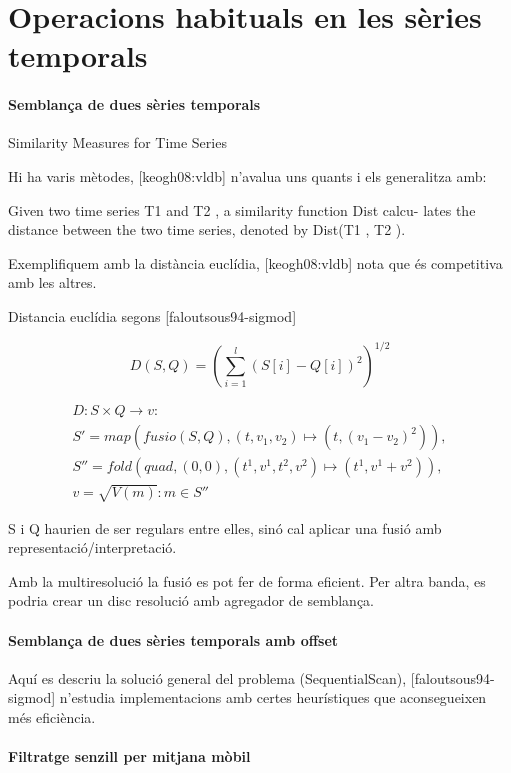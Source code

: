 \section{Operacions habituals en les sèries temporals}


\paragraph{Semblança de dues sèries temporals}


Similarity Measures for Time Series

Hi ha varis mètodes, [keogh08:vldb] n'avalua uns quants i els generalitza amb:

Given two
time series T1 and T2 , a similarity function Dist calcu-
lates the distance between the two time series, denoted by
Dist(T1 , T2 ).

Exemplifiquem amb la distància euclídia, [keogh08:vldb] nota que és
competitiva amb les altres.

Distancia euclídia segons [faloutsous94-sigmod]


\[
D(S,Q) = \left( \sum_{i=1}^{l} (S[i]-Q[i])^2  \right)^{1/2}
\]

\begin{gather*}
  D: S \times Q \longrightarrow v: \\
  S' = map(fusio(S,Q),(t,v_1,v_2)\mapsto(t,(v_1-v_2)^2)), \\
  S'' = fold(quad,(0,0),(t^1,v^1,t^2,v^2)\mapsto(t^1,v^1+v^2)), \\
  v = \sqrt{V(m)}:m\in S''
\end{gather*}


S i Q haurien de ser regulars entre elles, sinó cal aplicar una fusió amb representació/interpretació.

Amb la multiresolució la fusió es pot fer de forma eficient. Per altra banda, es podria crear un disc resolució amb agregador de semblança.


\paragraph{Semblança de dues sèries temporals amb offset}

Aquí es descriu la solució general del problema (SequentialScan),
[faloutsous94-sigmod] n'estudia implementacions amb certes
heurístiques que aconsegueixen més eficiència.





\paragraph{Filtratge senzill per mitjana mòbil}

